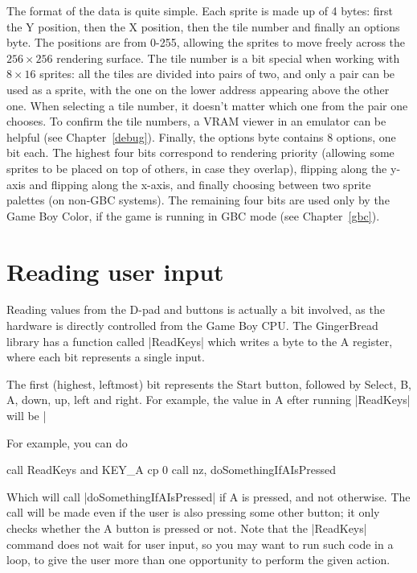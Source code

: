\documentclass[11pt]{book}
\begin{document}
The format of the data is quite simple. Each sprite is made up of 4 bytes: first the Y position, then the X position, then the tile number and finally an options byte. The positions are from 0-255, allowing the sprites to move freely across the $256\times256$ rendering surface. The tile number is a bit special when working with $8\times16$ sprites: all the tiles are divided into pairs of two, and only a pair can be used as a sprite, with the one on the lower address appearing above the other one. When selecting a tile number, it doesn't matter which one from the pair one chooses. To confirm the tile numbers, a VRAM viewer in an emulator can be helpful (see Chapter~\ref{debug}). Finally, the options byte contains 8 options, one bit each. The highest four bits correspond to rendering priority (allowing some sprites to be placed on top of others, in case they overlap), flipping along the y-axis and flipping along the x-axis, and finally choosing between two sprite palettes (on non-GBC systems). The remaining four bits are used only by the Game Boy Color, if the game is running in GBC mode (see Chapter~\ref{gbc}).

\section{Reading user input}
\label{userinput}
Reading values from the D-pad and buttons is actually a bit involved, as the hardware is directly controlled from the Game Boy CPU. The GingerBread library has a function called |ReadKeys| which writes a byte to the A register, where each bit represents a single input.

The first (highest, leftmost) bit represents the Start button, followed by Select, B, A, down, up, left and right. For example, the value in A efter running |ReadKeys| will be |%

For example, you can do 

\begin{code}
call ReadKeys
and KEY_A
cp 0
call nz, doSomethingIfAIsPressed
\end{code}

Which will call |doSomethingIfAIsPressed| if A is pressed, and not otherwise. The call will be made even if the user is also pressing some other button; it only checks whether the A button is pressed or not. Note that the |ReadKeys| command does not wait for user input, so you may want to run such code in a loop, to give the user more than one opportunity to perform the given action. 
\end{document}
